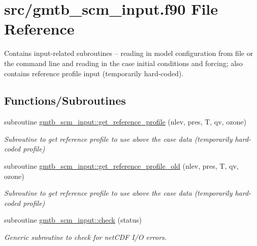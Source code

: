 \hypertarget{gmtb__scm__input_8f90}{}\section{src/gmtb\+\_\+scm\+\_\+input.f90 File Reference}
\label{gmtb__scm__input_8f90}


Contains input-\/related subroutines -- reading in model configuration from file or the command line and reading in the case initial conditions and forcing; also contains reference profile input (temporarily hard-\/coded).  


\subsection*{Functions/\+Subroutines}
\begin{DoxyCompactItemize}
\item 
subroutine \hyperlink{group__input_ga12863f4403aa8cec95a703d7820eae9b}{gmtb\+\_\+scm\+\_\+input\+::get\+\_\+reference\+\_\+profile} (nlev, pres, T, qv, ozone)
\begin{DoxyCompactList}\small\item\em Subroutine to get reference profile to use above the case data (temporarily hard-\/coded profile) \end{DoxyCompactList}\item 
subroutine \hyperlink{group__input_gac2f83200aaf1166b59444fcc3ec14f5c}{gmtb\+\_\+scm\+\_\+input\+::get\+\_\+reference\+\_\+profile\+\_\+old} (nlev, pres, T, qv, ozone)
\begin{DoxyCompactList}\small\item\em Subroutine to get reference profile to use above the case data (temporarily hard-\/coded profile) \end{DoxyCompactList}\item 
subroutine \hyperlink{group__input_gac802d5288c736faf2a5045c7f50b5f23}{gmtb\+\_\+scm\+\_\+input\+::check} (status)
\begin{DoxyCompactList}\small\item\em Generic subroutine to check for net\+C\+DF I/O errors. \end{DoxyCompactList}\end{DoxyCompactItemize}
{\bf }\par
